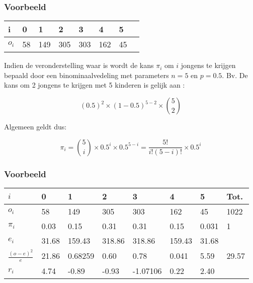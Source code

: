 \documentclass[aspectratio=169]{beamer}
\begin{document}
\begin{frame}
  \frametitle{Voorbeeld}
  \begin{table}[h]
    \begin{tabular}{@{}llllllll@{}}
      \toprule
      i       & 0  & 1   & 2   & 3   & 4   & 5  &  \\ \midrule
      $o_{i}$ & 58 & 149 & 305 & 303 & 162 & 45 &  \\ \bottomrule
    \end{tabular}
  \end{table}
  \pause
  Indien de veronderstelling waar is wordt de kans $\pi_{i}$ om $i$ jongens te krijgen bepaald door een binominaalvedeling met parameters $n=5$ en $p=0.5$.
  Bv. De kans om 2 jongens te krijgen met 5 kinderen is gelijk aan :
  
  \[ (0.5)^{2} \times (1-0.5)^{5-2} \times \binom{5}{2} \]
  
  Algemeen geldt dus:
  
  \[ \pi_{i} = \binom{5}{i}\times 0.5^{i} \times 0.5^{5-i} = \frac{5!}{i!(5-i)!}\times 0.5^{i} \]
\end{frame}

\begin{frame}
  \frametitle{Voorbeeld}
  \begin{table}[h]
    \begin{tabular}{@{}llllllll@{}}
      \toprule
      $i$                   & 0     & 1       & 2      & 3        & 4      & 5     & Tot.  \\ \midrule
      $o_i$                 & 58    & 149     & 305    & 303      & 162    & 45    & 1022  \\
      $\pi_i$               & 0.03  & 0.15    & 0.31   & 0.31     & 0.15   & 0.031 & 1     \\
      $e_i$                 & 31.68 & 159.43  & 318.86 & 318.86   & 159.43 & 31.68 &       \\
      $\frac{(o-e)^{2}}{e}$ & 21.86 & 0.68259 & 0.60   & 0.78     & 0.041  & 5.59  & 29.57 \\
      $r_i$                 & 4.74  & -0.89   & -0.93  & -1.07106 & 0.22   & 2.40  &       \\ \bottomrule
    \end{tabular}
  \end{table}
\end{frame}
\end{document}
